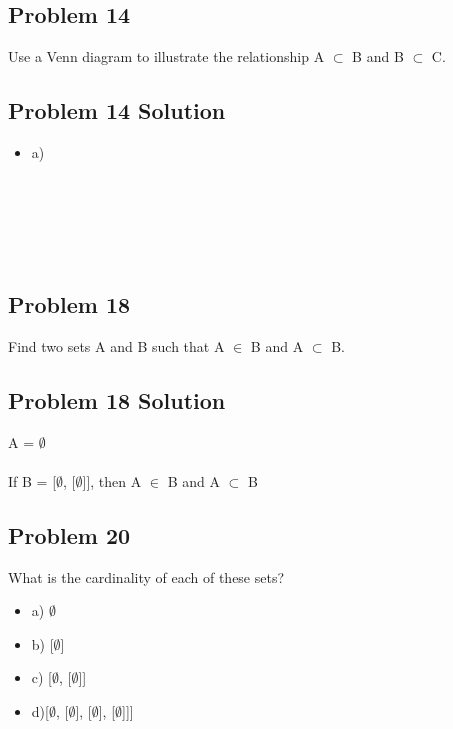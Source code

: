 \documentclass[11pt]{article}
\begin{document}
\subsection{Problem 14}

Use a Venn diagram to illustrate the relationship A $\subset$  B and B $\subset$ C.

\subsection{Problem 14 Solution}

\begin{itemize}
\item a) \\
\\
\\
\\
\\
\\
\end{itemize}

\subsection{Problem 18}

Find two sets A and B such that A $\in$ B and A $\subset$ B.

\subsection{Problem 18 Solution}

A = $\emptyset$ \\
\\
If B = [$\emptyset$, [$\emptyset$]], then A $\in$ B and A $\subset$ B \\

\subsection{Problem 20}

What is the cardinality of each of these sets?

\begin{itemize}
\item a) $\emptyset$
\item b) [$\emptyset$]
\item c) [$\emptyset$, [$\emptyset$]]
\item d)[$\emptyset$, [$\emptyset$], [$\emptyset$], [$\emptyset$]]]
\end{itemize}
\end{document}
